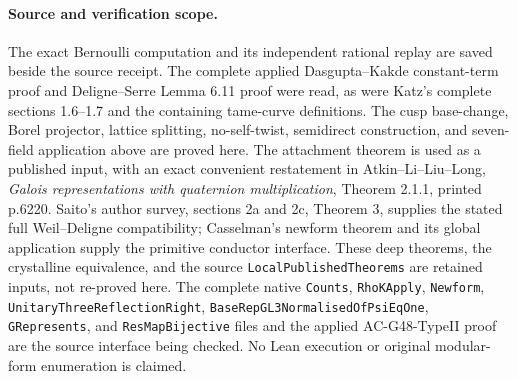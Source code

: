 \paragraph{Source and verification scope.}
The exact Bernoulli computation and its independent rational replay are
saved beside the source receipt.  The complete applied Dasgupta--Kakde
constant-term proof and Deligne--Serre Lemma 6.11 proof were read, as were
Katz's complete sections 1.6--1.7 and the containing tame-curve definitions.
The cusp base-change, Borel projector, lattice splitting, no-self-twist,
semidirect construction, and seven-field application above are proved here.
The attachment theorem is used as a published input, with an exact convenient
restatement in Atkin--Li--Liu--Long, \emph{Galois representations with quaternion
multiplication}, Theorem 2.1.1, printed p.6220.
Saito's author survey, sections 2a and 2c, Theorem 3, supplies the stated full
Weil--Deligne compatibility; Casselman's newform theorem and its global
application supply the primitive conductor interface.  These deep theorems,
the crystalline equivalence, and the source
\texttt{LocalPublishedTheorems} are retained inputs, not re-proved here.
The complete native \texttt{Counts}, \texttt{RhoKApply}, \texttt{Newform},
\texttt{UnitaryThreeReflectionRight}, \texttt{BaseRepGL3NormalisedOfPsiEqOne},
\texttt{GRepresents}, and \texttt{ResMapBijective} files and the applied
AC-G48-TypeII proof are the source interface being checked.
No Lean execution or original modular-form enumeration is claimed.
